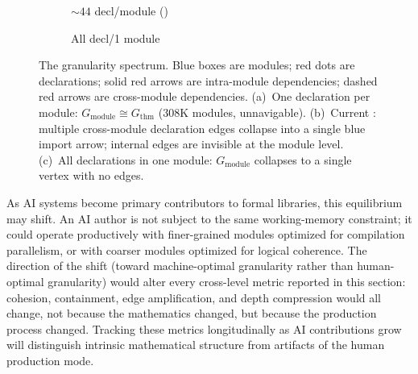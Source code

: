 \begin{figure}[ht]
\begin{subfigure}[b]{0.36\textwidth}
\caption{${\sim}44$ decl/module ()}
\label{fig:gran-current}
\end{subfigure}%
\hfill
\begin{subfigure}[b]{0.30\textwidth}
\centering
{}
\caption{All decl/1 module}
\label{fig:gran-coarse}
\end{subfigure}
\caption{The granularity spectrum. \textcolor{blue!60!black}{Blue boxes} are modules; \textcolor{red!70!black}{red dots} are declarations; \textcolor{red!70!black}{solid red arrows} are intra-module dependencies; \textcolor{red!70!black}{dashed red arrows} are cross-module dependencies. (a)~One declaration per module: $G_{\mathrm{module}} \cong G_{\mathrm{thm}}$ ($308$K modules, unnavigable). (b)~Current : multiple cross-module declaration edges collapse into a single \textcolor{blue!60!black}{blue import} arrow; internal edges are invisible at the module level. (c)~All declarations in one module: $G_{\mathrm{module}}$ collapses to a single vertex with no edges.}
\label{fig:granularity-spectrum}
\end{figure}

As AI systems become primary contributors to formal libraries, this equilibrium may shift. An AI author is not subject to the same working-memory constraint; it could operate productively with finer-grained modules optimized for compilation parallelism, or with coarser modules optimized for logical coherence. The direction of the shift (toward machine-optimal granularity rather than human-optimal granularity) would alter every cross-level metric reported in this section: cohesion, containment, edge amplification, and depth compression would all change, not because the mathematics changed, but because the production process changed. Tracking these metrics longitudinally as AI contributions grow will distinguish intrinsic mathematical structure from artifacts of the human production mode.

